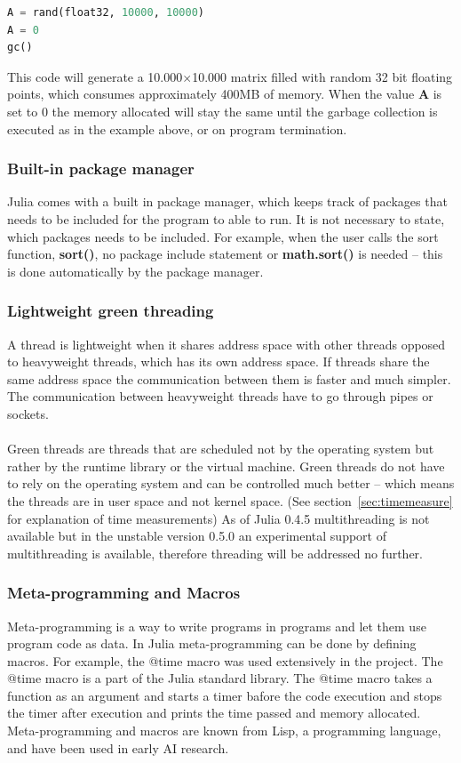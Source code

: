 \documentclass[a4paper, 11pt, titlepage]{article}
\begin{document}
\begin{lstlisting}[language=python]
A = rand(float32, 10000, 10000) 
A = 0
gc() 
\end{lstlisting}
This code will generate a 10.000$\times$10.000 matrix filled with random 32 bit floating points, which consumes approximately 400MB of memory. When the value \textbf{A} is set to 0 the memory allocated will stay the same until the garbage collection is executed as in the example above, or on program termination. 

\subsubsection{Built-in package manager}
Julia comes with a built in package manager, which keeps track of packages that needs to be included for the program to able to run. It is not necessary to state, which packages needs to be included. For example, when the user calls the sort function, \textbf{sort()}, no package include statement or \textbf{math.sort()} is needed – this is done automatically by the package manager.

\subsubsection{Lightweight green threading}
A thread is lightweight when it shares address space with other threads opposed to heavyweight threads, which has its own address space. If threads share the same address space the communication between them is faster and much simpler. The communication between heavyweight threads have to go through pipes or sockets. \\
\\
Green threads are threads that are scheduled not by the operating system but rather by the runtime library or the virtual machine. Green threads do not have to rely on the operating system and can be controlled much better – which means the threads are in user space and not kernel space. (See section~\ref{sec:timemeasure} for explanation of time measurements) As of Julia 0.4.5 multithreading is not available but in the unstable version 0.5.0 an experimental support of multithreading is available, therefore threading will be addressed no further. 

\subsubsection{Meta-programming and Macros}
Meta-programming is a way to write programs in programs and let them use program code as data. In Julia meta-programming can be done by defining macros. For example, the @time macro was used extensively in the project. The @time macro is a part of the Julia standard library. The @time macro takes a function as an argument and starts a timer bafore the code execution and stops the timer after execution and prints the time passed and memory allocated. Meta-programming and macros are known from Lisp, a programming language, and have been used in early AI research. 
\end{document}
